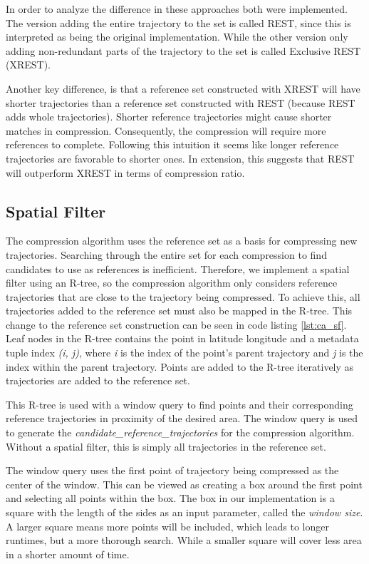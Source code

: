 In order to analyze the difference in these approaches both were implemented. The version adding the entire trajectory to the set is called REST, since this is interpreted as being the original implementation. While the other version only adding non-redundant parts of the trajectory to the set is called Exclusive REST (XREST).

Another key difference, is that a reference set constructed with XREST will have shorter trajectories than a reference set constructed with REST (because REST adds whole trajectories). Shorter reference trajectories might cause shorter matches in compression. Consequently, the compression will require more references to complete. Following this intuition it seems like longer reference trajectories are favorable to shorter ones. In extension, this suggests that REST will outperform XREST in terms of compression ratio.

\subsection{Spatial Filter}
\label{sec:sf}
The compression algorithm uses the reference set as a basis for compressing new trajectories. Searching through the entire set for each compression to find candidates to use as references is inefficient. Therefore, we implement a spatial filter using an R-tree, so the compression algorithm only considers reference trajectories that are close to the trajectory being compressed. To achieve this, all trajectories added to the reference set must also be mapped in the R-tree. This change to the reference set construction can be seen in code listing \ref{lst:ca_sf}. Leaf nodes in the R-tree contains the point in latitude longitude and a metadata tuple index \textit{(i, j)}, where \textit{i} is the index of the point's parent trajectory and \textit{j} is the index within the parent trajectory. Points are added to the R-tree iteratively as trajectories are added to the reference set.

This R-tree is used with a window query to find points and their corresponding reference trajectories in proximity of the desired area. The window query is used to generate the \textit{candidate\_reference\_trajectories} for the compression algorithm. Without a spatial filter, this is simply all trajectories in the reference set.

The window query uses the first point of trajectory being compressed as the center of the window. This can be viewed as creating a box around the first point and selecting all points within the box. The box in our implementation is a square with the length of the sides as an input parameter, called the \textit{window size}. A larger square means more points will be included, which leads to longer runtimes, but a more thorough search. While a smaller square will cover less area in a shorter amount of time.


